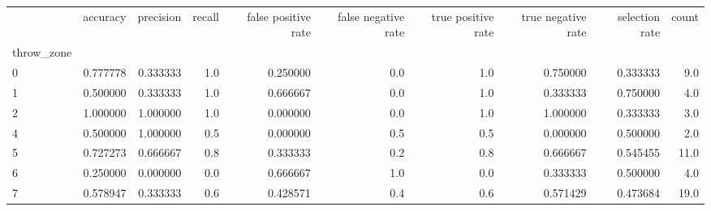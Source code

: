 \begin{tabular}{lrrrrrrrrr}
\toprule
{} &  accuracy &  precision &  recall &  false positive rate &  false negative rate &  true positive rate &  true negative rate &  selection rate &  count \\
throw\_zone &           &            &         &                      &                      &                     &                     &                 &        \\
\midrule
0          &  0.777778 &   0.333333 &     1.0 &             0.250000 &                  0.0 &                 1.0 &            0.750000 &        0.333333 &    9.0 \\
1          &  0.500000 &   0.333333 &     1.0 &             0.666667 &                  0.0 &                 1.0 &            0.333333 &        0.750000 &    4.0 \\
2          &  1.000000 &   1.000000 &     1.0 &             0.000000 &                  0.0 &                 1.0 &            1.000000 &        0.333333 &    3.0 \\
4          &  0.500000 &   1.000000 &     0.5 &             0.000000 &                  0.5 &                 0.5 &            0.000000 &        0.500000 &    2.0 \\
5          &  0.727273 &   0.666667 &     0.8 &             0.333333 &                  0.2 &                 0.8 &            0.666667 &        0.545455 &   11.0 \\
6          &  0.250000 &   0.000000 &     0.0 &             0.666667 &                  1.0 &                 0.0 &            0.333333 &        0.500000 &    4.0 \\
7          &  0.578947 &   0.333333 &     0.6 &             0.428571 &                  0.4 &                 0.6 &            0.571429 &        0.473684 &   19.0 \\
\bottomrule
\end{tabular}
